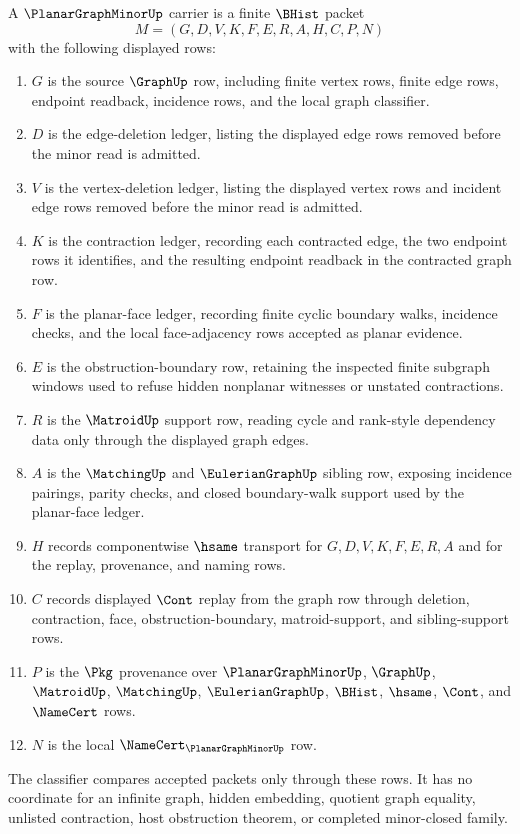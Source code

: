 \begin{definition}
\label{def:planar-graph-minor-carrier}
A $\PlanarGraphMinorUp$ carrier is a finite $\BHist$ packet
$$
M=(G,D,V,K,F,E,R,A,H,C,P,N)
$$
with the following displayed rows:
\begin{enumerate}
\item $G$ is the source $\GraphUp$ row, including finite vertex rows, finite edge rows, endpoint readback, incidence rows, and the local graph classifier.
\item $D$ is the edge-deletion ledger, listing the displayed edge rows removed before the minor read is admitted.
\item $V$ is the vertex-deletion ledger, listing the displayed vertex rows and incident edge rows removed before the minor read is admitted.
\item $K$ is the contraction ledger, recording each contracted edge, the two endpoint rows it identifies, and the resulting endpoint readback in the contracted graph row.
\item $F$ is the planar-face ledger, recording finite cyclic boundary walks, incidence checks, and the local face-adjacency rows accepted as planar evidence.
\item $E$ is the obstruction-boundary row, retaining the inspected finite subgraph windows used to refuse hidden nonplanar witnesses or unstated contractions.
\item $R$ is the $\MatroidUp$ support row, reading cycle and rank-style dependency data only through the displayed graph edges.
\item $A$ is the $\MatchingUp$ and $\EulerianGraphUp$ sibling row, exposing incidence pairings, parity checks, and closed boundary-walk support used by the planar-face ledger.
\item $H$ records componentwise $\hsame$ transport for $G,D,V,K,F,E,R,A$ and for the replay, provenance, and naming rows.
\item $C$ records displayed $\Cont$ replay from the graph row through deletion, contraction, face, obstruction-boundary, matroid-support, and sibling-support rows.
\item $P$ is the $\Pkg$ provenance over $\PlanarGraphMinorUp$, $\GraphUp$, $\MatroidUp$, $\MatchingUp$, $\EulerianGraphUp$, $\BHist$, $\hsame$, $\Cont$, and $\NameCert$ rows.
\item $N$ is the local $\NameCert_{\PlanarGraphMinorUp}$ row.
\end{enumerate}
The classifier compares accepted packets only through these rows. It has no coordinate for an infinite graph, hidden embedding, quotient graph equality, unlisted contraction, host obstruction theorem, or completed minor-closed family.
\end{definition}

